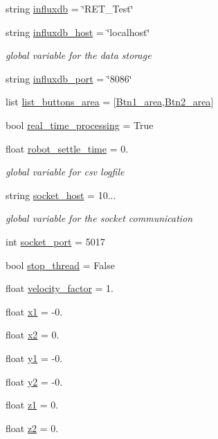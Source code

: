 \begin{DoxyCompactItemize}
\item 
string \hyperlink{namespaceRET__config_a6297da7d9cbabcbe91effb0271677ff3}{influxdb} = \char`\"{}R\+E\+T\+\_\+\+Test\char`\"{}
\item 
string \hyperlink{namespaceRET__config_a5ad590543d5ae7b0a89b3681d33928d8}{influxdb\+\_\+host} = \char`\"{}localhost\char`\"{}
\begin{DoxyCompactList}\small\item\em global variable for the data storage \end{DoxyCompactList}\item 
string \hyperlink{namespaceRET__config_a91cab5b28cd6867b74e2cb9f887b2948}{influxdb\+\_\+port} = \char`\"{}8086\char`\"{}
\item 
list \hyperlink{namespaceRET__config_a25b4602337319d65f44337e6ad1b0487}{list\+\_\+buttons\+\_\+area} = \mbox{[}\hyperlink{namespaceRET__config_a118140d2896d1aff1e3c9355f9deb314}{Btn1\+\_\+area},\hyperlink{namespaceRET__config_a51a4083768cbc17b22a98ad63a7bf851}{Btn2\+\_\+area}\mbox{]}
\item 
bool \hyperlink{namespaceRET__config_a4132cf21a6c01ecf59141756ab5f9936}{real\+\_\+time\+\_\+processing} = True
\item 
float \hyperlink{namespaceRET__config_aff247d8ee094bb439dbb098e236455cb}{robot\+\_\+settle\+\_\+time} = 0.
\begin{DoxyCompactList}\small\item\em global variable for csv logfile \end{DoxyCompactList}\item 
string \hyperlink{namespaceRET__config_a2014ea8569b3cda02e44e85f8840eba2}{socket\+\_\+host} = \textquotesingle{}10...\textquotesingle{}
\begin{DoxyCompactList}\small\item\em global variable for the socket communication \end{DoxyCompactList}\item 
int \hyperlink{namespaceRET__config_a08c4648fe1aa34a4fd5ad0097d17237f}{socket\+\_\+port} = 5017
\item 
bool \hyperlink{namespaceRET__config_a94d742b756b055a53df310fd15705ede}{stop\+\_\+thread} = False
\item 
float \hyperlink{namespaceRET__config_a0fee7ae942bb4b6078c6400331aef6f1}{velocity\+\_\+factor} = 1.
\item 
float \hyperlink{namespaceRET__config_a3389d8b95846602e8f94cc15f41e48e9}{x1} = -\/0.
\item 
float \hyperlink{namespaceRET__config_a24d6ffb6e8780eef0c81cd97e3f4fdaf}{x2} = 0.
\item 
float \hyperlink{namespaceRET__config_a9fe80bf4738047a31d7c162807ed85f0}{y1} = -\/0.
\item 
float \hyperlink{namespaceRET__config_a07bcd014e69eddcf4243b2a961014eaf}{y2} = -\/0.
\item 
float \hyperlink{namespaceRET__config_a7da4886c0a2e03b8bb9ed62eb20efb78}{z1} = 0.
\item 
float \hyperlink{namespaceRET__config_a55196b87940893e540ba636218f4eb07}{z2} = 0.
\end{DoxyCompactItemize}


